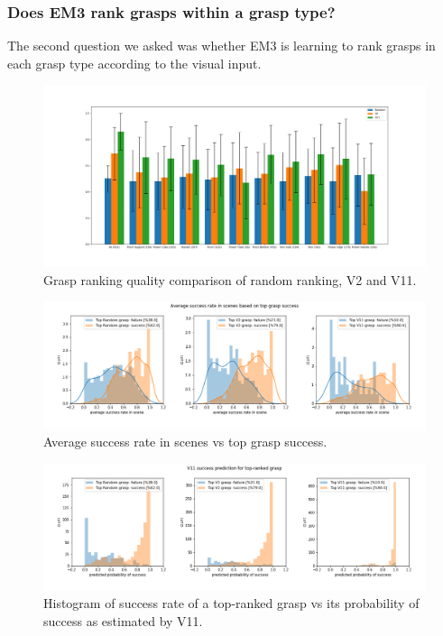 \subsubsection{Does EM3 rank grasps within a grasp type?}
\noindent

The second question we asked was whether EM3 is learning to rank grasps in each grasp type according to the visual input. 

\begin{figure}
\centering
\includegraphics[width=0.999\columnwidth]{images/post-analysis/[5] Ranking_quality_mean_AUC.png}
\caption{Grasp ranking quality comparison of random ranking, V2 and V11.}
\label{fig:post5}
\end{figure}

\begin{figure}
\centering
\includegraphics[width=0.8\columnwidth]{images/post-analysis/[7] Average_success_rate_in_scenes_based_on_top_grasp_success.png}
\caption{Average success rate in scenes vs top grasp success.}
\label{fig:post7}
\end{figure}

\begin{figure}
\centering
\includegraphics[width=0.8\columnwidth]{images/post-analysis/[8] V11_success_prediction_for_top-ranked_grasp.png}
\caption{Histogram of success rate of a top-ranked grasp vs its probability of success as estimated by V11.}
\label{fig:post8}
\end{figure}

